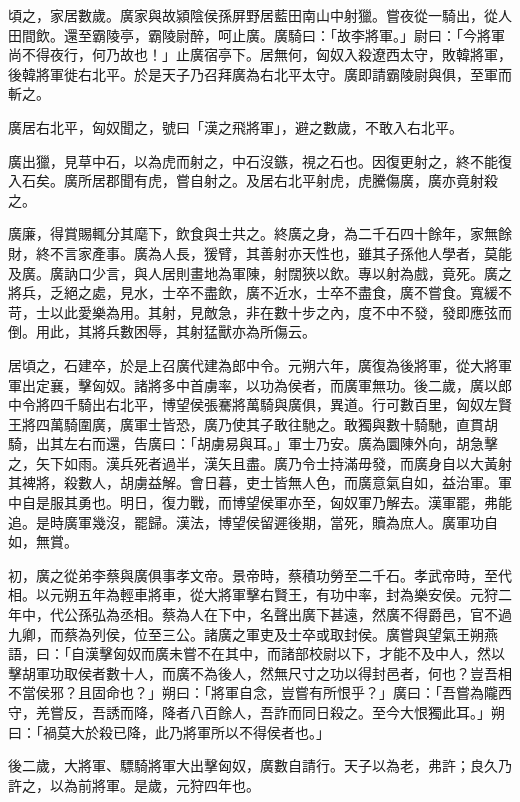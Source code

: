 \begin{pinyinscope}
頃之，家居數歲。廣家與故潁陰侯孫屏野居藍田南山中射獵。嘗夜從一騎出，從人田間飲。還至霸陵亭，霸陵尉醉，呵止廣。廣騎曰：「故李將軍。」尉曰：「今將軍尚不得夜行，何乃故也！」止廣宿亭下。居無何，匈奴入殺遼西太守，敗韓將軍，後韓將軍徙右北平。於是天子乃召拜廣為右北平太守。廣即請霸陵尉與俱，至軍而斬之。

廣居右北平，匈奴聞之，號曰「漢之飛將軍」，避之數歲，不敢入右北平。

廣出獵，見草中石，以為虎而射之，中石沒鏃，視之石也。因復更射之，終不能復入石矣。廣所居郡聞有虎，嘗自射之。及居右北平射虎，虎騰傷廣，廣亦竟射殺之。

廣廉，得賞賜輒分其麾下，飲食與士共之。終廣之身，為二千石四十餘年，家無餘財，終不言家產事。廣為人長，猨臂，其善射亦天性也，雖其子孫他人學者，莫能及廣。廣訥口少言，與人居則畫地為軍陳，射闊狹以飲。專以射為戲，竟死。廣之將兵，乏絕之處，見水，士卒不盡飲，廣不近水，士卒不盡食，廣不嘗食。寬緩不苛，士以此愛樂為用。其射，見敵急，非在數十步之內，度不中不發，發即應弦而倒。用此，其將兵數困辱，其射猛獸亦為所傷云。

居頃之，石建卒，於是上召廣代建為郎中令。元朔六年，廣復為後將軍，從大將軍軍出定襄，擊匈奴。諸將多中首虜率，以功為侯者，而廣軍無功。後二歲，廣以郎中令將四千騎出右北平，博望侯張騫將萬騎與廣俱，異道。行可數百里，匈奴左賢王將四萬騎圍廣，廣軍士皆恐，廣乃使其子敢往馳之。敢獨與數十騎馳，直貫胡騎，出其左右而還，告廣曰：「胡虜易與耳。」軍士乃安。廣為圜陳外向，胡急擊之，矢下如雨。漢兵死者過半，漢矢且盡。廣乃令士持滿毋發，而廣身自以大黃射其裨將，殺數人，胡虜益解。會日暮，吏士皆無人色，而廣意氣自如，益治軍。軍中自是服其勇也。明日，復力戰，而博望侯軍亦至，匈奴軍乃解去。漢軍罷，弗能追。是時廣軍幾沒，罷歸。漢法，博望侯留遲後期，當死，贖為庶人。廣軍功自如，無賞。

初，廣之從弟李蔡與廣俱事孝文帝。景帝時，蔡積功勞至二千石。孝武帝時，至代相。以元朔五年為輕車將車，從大將軍擊右賢王，有功中率，封為樂安侯。元狩二年中，代公孫弘為丞相。蔡為人在下中，名聲出廣下甚遠，然廣不得爵邑，官不過九卿，而蔡為列侯，位至三公。諸廣之軍吏及士卒或取封侯。廣嘗與望氣王朔燕語，曰：「自漢擊匈奴而廣未嘗不在其中，而諸部校尉以下，才能不及中人，然以擊胡軍功取侯者數十人，而廣不為後人，然無尺寸之功以得封邑者，何也？豈吾相不當侯邪？且固命也？」朔曰：「將軍自念，豈嘗有所恨乎？」廣曰：「吾嘗為隴西守，羌嘗反，吾誘而降，降者八百餘人，吾詐而同日殺之。至今大恨獨此耳。」朔曰：「禍莫大於殺已降，此乃將軍所以不得侯者也。」

後二歲，大將軍、驃騎將軍大出擊匈奴，廣數自請行。天子以為老，弗許；良久乃許之，以為前將軍。是歲，元狩四年也。


\end{pinyinscope}
